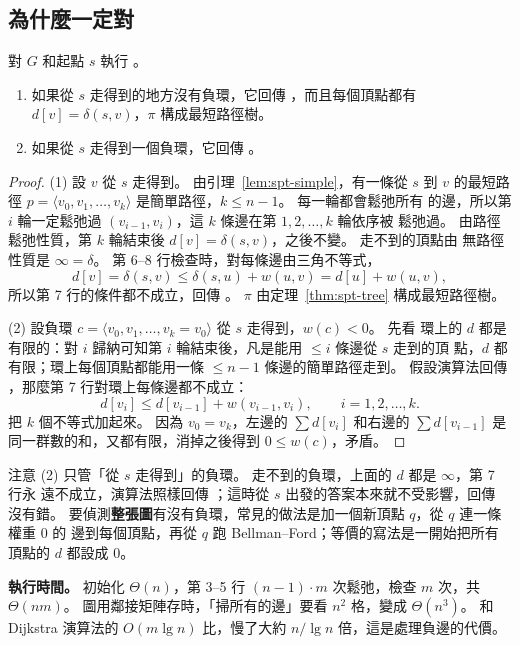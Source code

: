 \subsection{為什麼一定對}

\begin{theorem}
\label{thm:spt-bf}
對 $G$ 和起點 $s$ 執行 。
\begin{enumerate}
\item 如果從 $s$ 走得到的地方沒有負環，它回傳 \TRUE，而且每個頂點都有 $d[v] = \delta(s,
v)$，$\pi$ 構成最短路徑樹。
\item 如果從 $s$ 走得到一個負環，它回傳 \FALSE。
\end{enumerate}
\end{theorem}

\begin{proof}
(1) 設 $v$ 從 $s$ 走得到。 由引理~\ref{lem:spt-simple}，有一條從 $s$ 到 $v$ 的最短路徑
$p = \langle v_0, v_1, \ldots, v_k \rangle$ 是簡單路徑，$k \le n - 1$。 每一輪都會鬆弛所有
的邊，所以第 $i$ 輪一定鬆弛過 $(v_{i-1}, v_i)$，這 $k$ 條邊在第 $1, 2, \ldots, k$ 輪依序被
鬆弛過。 由路徑鬆弛性質，第 $k$ 輪結束後 $d[v] = \delta(s, v)$，之後不變。 走不到的頂點由
無路徑性質是 $\infty = \delta$。 第 6--8 行檢查時，對每條邊由三角不等式，
\[
d[v] = \delta(s, v) \le \delta(s, u) + w(u, v) = d[u] + w(u, v),
\]
所以第 7 行的條件都不成立，回傳 \TRUE。 $\pi$ 由定理~\ref{thm:spt-tree} 構成最短路徑樹。

(2) 設負環 $c = \langle v_0, v_1, \ldots, v_k = v_0 \rangle$ 從 $s$ 走得到，$w(c) < 0$。 先看
環上的 $d$ 都是有限的：對 $i$ 歸納可知第 $i$ 輪結束後，凡是能用 $\le i$ 條邊從 $s$ 走到的頂
點，$d$ 都有限；環上每個頂點都能用一條 $\le n - 1$ 條邊的簡單路徑走到。 假設演算法回傳
\TRUE，那麼第 7 行對環上每條邊都不成立：
\[
d[v_i] \le d[v_{i-1}] + w(v_{i-1}, v_i), \qquad i = 1, 2, \ldots, k.
\]
把 $k$ 個不等式加起來。 因為 $v_0 = v_k$，左邊的 $\sum d[v_i]$ 和右邊的 $\sum d[v_{i-1}]$
是同一群數的和，又都有限，消掉之後得到 $0 \le w(c)$，矛盾。
\end{proof}

注意 (2) 只管「從 $s$ 走得到」的負環。 走不到的負環，上面的 $d$ 都是 $\infty$，第 7 行永
遠不成立，演算法照樣回傳 \TRUE；這時從 $s$ 出發的答案本來就不受影響，回傳 \TRUE 沒有錯。
要偵測\textbf{整張圖}有沒有負環，常見的做法是加一個新頂點 $q$，從 $q$ 連一條權重 $0$ 的
邊到每個頂點，再從 $q$ 跑 Bellman--Ford；等價的寫法是一開始把所有頂點的 $d$ 都設成 $0$。

\textbf{執行時間。} 初始化 $\Theta(n)$，第 3--5 行 $(n - 1) \cdot m$ 次鬆弛，檢查 $m$ 次，共
$\Theta(nm)$。 圖用鄰接矩陣存時，「掃所有的邊」要看 $n^2$ 格，變成 $\Theta(n^3)$。 和
Dijkstra 演算法的 $O(m \lg n)$ 比，慢了大約 $n / \lg n$ 倍，這是處理負邊的代價。

